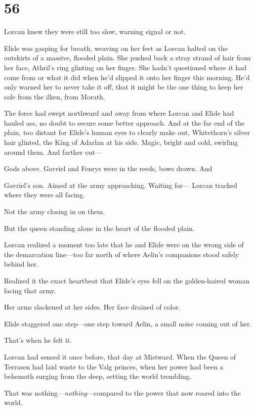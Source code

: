 
\chapter{56}

Lorcan knew they were still too slow, warning signal or not.

Elide was gasping for breath, weaving on her feet as Lorcan halted on the outskirts of a massive, flooded plain. She pushed back a stray strand of hair from her face, Athril's ring glinting on her finger. She hadn't questioned where it had come from or what it did when he'd slipped it onto her finger this morning. He'd only warned her to never take it off, that it might be the one thing to keep her safe from the ilken, from Morath.

The force had swept northward and away from where Lorcan and Elide had hauled ass, no doubt to secure some better approach. And at the far end of the plain, too distant for Elide's human eyes to clearly make out, Whitethorn's silver hair glinted, the King of Adarlan at his side. Magic, bright and cold, swirling around them. And farther out---

Gods above. Gavriel and Fenrys were in the reeds, bows drawn. And

Gavriel's son. Aimed at the army approaching. Waiting for--- Lorcan tracked where they were all facing.

Not the army closing in on them.

But the queen standing alone in the heart of the flooded plain.

Lorcan realized a moment too late that he and Elide were on the wrong side of the demarcation line---too far north of where Aelin's companions stood safely behind her.

Realized it the exact heartbeat that Elide's eyes fell on the golden-haired woman facing that army.

Her arms slackened at her sides. Her face drained of color.

Elide staggered one step---one step toward Aelin, a small noise coming out of her.

That's when he felt it.

Lorcan had sensed it once before, that day at Mistward. When the Queen of Terrasen had laid waste to the Valg princes, when her power had been a behemoth surging from the deep, setting the world trembling.

That was nothing---\emph{nothing}---compared to the power that now roared into the world.

